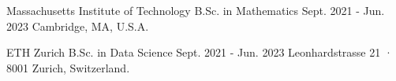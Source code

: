 
\begin{cventries}

  \cventry
    {Massachusetts Institute of Technology} %
    {B.Sc. in Mathematics} %
    {Sept. 2021 - Jun. 2023} %
    {Cambridge, MA, U.S.A.} %
    {}
  
  \cventry
    {ETH Zurich} %
    {B.Sc. in Data Science} %
    {Sept. 2021 - Jun. 2023} %
    {Leonhardstrasse 21 · 8001 Zurich, Switzerland.} %
    {}

\end{cventries}
